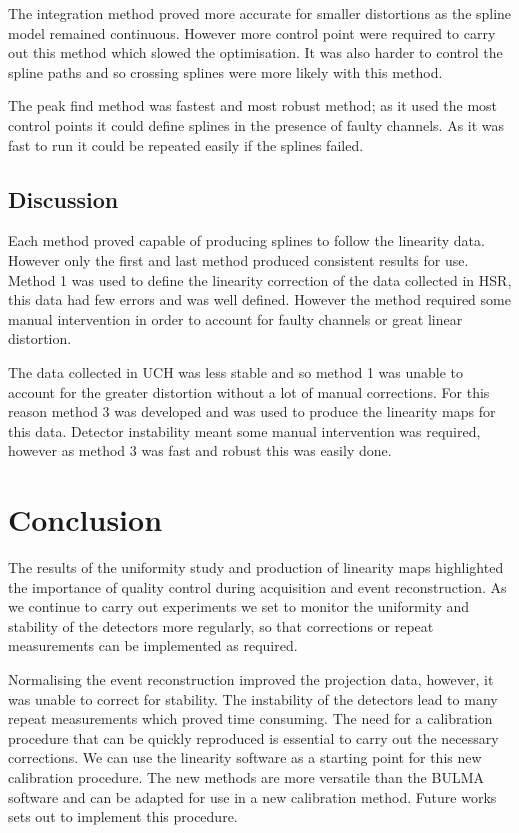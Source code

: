 The integration method proved more accurate for smaller distortions as the spline model remained continuous. However more control point were required to carry out this method which slowed the optimisation. It was also harder to control the spline paths and so crossing splines were more likely with this method. 

The peak find method was fastest and most robust method; as it used the most control points it could define splines in the presence of faulty channels. As it was fast to run it could be repeated easily if the splines failed. 
\subsection{Discussion}
Each method proved capable of producing splines to follow the linearity data. However only the first and last method produced consistent results for use. Method 1 was used to define the linearity correction of the data collected in \acrshort{HSR}, this data had few errors and was well defined. However the method required some manual intervention in order to account for faulty channels or great linear distortion. 

The data collected in \acrshort{UCH} was less stable and so method 1 was unable to account for the greater distortion without a lot of manual corrections. For this reason method 3 was developed and was used to produce the linearity maps for this data. Detector instability meant some manual intervention was required, however as method 3 was fast and robust this was easily done. 
\section{Conclusion}
The results of the uniformity study and production of linearity maps highlighted the importance of quality control during acquisition and event reconstruction. As we continue to carry out experiments we set to monitor the uniformity and stability of the detectors more regularly, so that corrections or repeat measurements can be implemented as required.

Normalising the event reconstruction improved the projection data, however, it was unable to correct for stability. The instability of the detectors lead to many repeat measurements which proved time consuming. The need for a calibration procedure that can be quickly reproduced is essential to carry out the necessary corrections. We can use the linearity software as a starting point for this new calibration procedure. The new methods are more versatile than the BULMA software and can be adapted for use in a new calibration method. Future works sets out to implement this procedure. 

